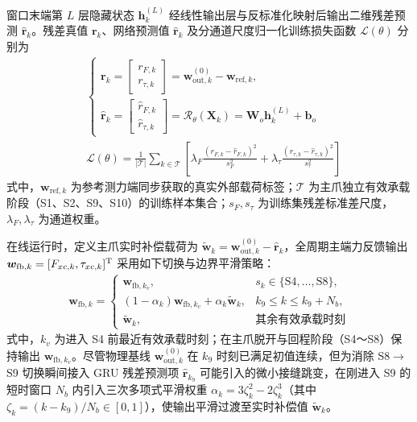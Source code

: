 \documentclass{JQRnew}
\begin{document}
窗口末端第 $L$ 层隐藏状态 $\bm{h}_{k}^{(L)}$ 经线性输出层与反标准化映射后输出二维残差预测 $\widehat{\bm{r}}_{k}$。残差真值 $\bm{r}_{k}$、网络预测值 $\widehat{\bm{r}}_{k}$ 及分通道尺度归一化训练损失函数 $\mathcal{L}(\theta)$ 分别为
\begin{align}
	\label{eq15}
	&\begin{cases}
		\bm{r}_{k} =
		\begin{bmatrix}
			r_{F,k} \\
			r_{\tau,k}
		\end{bmatrix}
		= \bm{w}_{\text{out},k}^{(0)} - \bm{w}_{\text{ref},k}, \\
		\widehat{\bm{r}}_{k} =
		\begin{bmatrix}
			\widehat{r}_{F,k} \\
			\widehat{r}_{\tau,k}
		\end{bmatrix}
		= \mathcal{R}_{\theta}(\bm{X}_{k}) = \bm{W}_{o}\bm{h}_{k}^{(L)} + \bm{b}_{o}
	\end{cases} \\
	\label{eq16}
	&\mathcal{L}(\theta) = \frac{1}{|\mathcal{T}|}\sum_{k \in \mathcal{T}}\left[ \lambda_{F}\frac{(r_{F,k} - \widehat{r}_{F,k})^{2}}{s_{F}^{2}} + \lambda_{\tau}\frac{(r_{\tau,k} - \widehat{r}_{\tau,k})^{2}}{s_{\tau}^{2}} \right]
\end{align}
式中，$\bm{w}_{\text{ref},k}$ 为参考测力端同步获取的真实外部载荷标签；$\mathcal{T}$ 为主爪独立有效承载阶段（S1、S2、S9、S10）的训练样本集合；$s_{F},s_{\tau}$ 为训练集残差标准差尺度，$\lambda_{F},\lambda_{\tau}$ 为通道权重。

在线运行时，定义主爪实时补偿载荷为 $\widetilde{\bm{w}}_{k} = \bm{w}_{\text{out},k}^{(0)} - \widehat{\bm{r}}_{k}$，全周期主端力反馈输出 $\bm{w}_{\text{fb},k} = [F_{xc,k},\tau_{xc,k}]^{\rm T}$ 采用如下切换与边界平滑策略：
\begin{align}
	\label{eq17}
	\bm{w}_{\text{fb},k} =
	\begin{cases}
		\bm{w}_{\text{fb},k_{v}}, & s_{k} \in \{ \text{S4},\ldots,\text{S8}\}, \\
		(1 - \alpha_{k})\bm{w}_{\text{fb},k_{v}} + \alpha_{k}\widetilde{\bm{w}}_{k}, & k_{9} \le k \le k_{9} + N_{b}, \\
		\widetilde{\bm{w}}_{k}, & \text{其余有效承载时刻}
	\end{cases}
\end{align}
式中，$k_{v}$ 为进入 S4 前最近有效承载时刻；在主爪脱开与回程阶段（S4～S8）保持输出 $\bm{w}_{\text{fb},k_{v}}$。尽管物理基线 $\bm{w}_{\text{out},k}^{(0)}$ 在 $k_{9}$ 时刻已满足初值连续，但为消除 S8$\to$S9 切换瞬间接入 GRU 残差预测项 $\widehat{\bm{r}}_{k_{9}}$ 可能引入的微小接缝跳变，在刚进入 S9 的短时窗口 $N_{b}$ 内引入三次多项式平滑权重 $\alpha_{k} = 3\zeta_{k}^{2} - 2\zeta_{k}^{3}$（其中 $\zeta_{k} = (k - k_{9})/N_{b} \in [0,1]$），使输出平滑过渡至实时补偿值 $\widetilde{\bm{w}}_{k}$。
\end{document}
